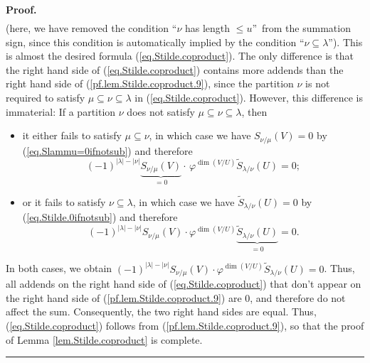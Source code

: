 \documentclass[numbers=enddot,12pt,final,onecolumn,notitlepage]{scrartcl}%
\numberwithin{exer}{section}
\theoremstyle{definition}
\newenvironment{proof}[1][Proof]{\noindent\textbf{#1.} }{\ \rule{0.5em}{0.5em}}
\theoremstyle{plainsl}
\begin{document}
\begin{proof}
\begin{align}
\label{pf.lem.Stilde.coproduct.9}%
\end{align}
(here, we have removed the condition \textquotedblleft$\nu$ has length $\leq
u$\textquotedblright\ from the summation sign, since this condition is
automatically implied by the condition \textquotedblleft$\nu\subseteq\lambda
$\textquotedblright). This is almost the desired formula
(\ref{eq.Stilde.coproduct}). The only difference is that the right hand side
of (\ref{eq.Stilde.coproduct}) contains more addends than the right hand side
of (\ref{pf.lem.Stilde.coproduct.9}), since the partition $\nu$ is not
required to satisfy $\mu\subseteq\nu\subseteq\lambda$ in
(\ref{eq.Stilde.coproduct}). However, this difference is immaterial: If a
partition $\nu$ does not satisfy $\mu\subseteq\nu\subseteq\lambda$, then

\begin{itemize}
\item it either fails to satisfy $\mu\subseteq\nu$, in which case we have
$S_{\nu/\mu}\left(  V\right)  =0$ by (\ref{eq.Slammu=0ifnotsub}) and therefore%
\[
\left(  -1\right)  ^{\left\vert \lambda\right\vert -\left\vert \nu\right\vert
}\underbrace{S_{\nu/\mu}\left(  V\right)  }_{=0}\cdot\,\varphi^{\dim\left(
V/U\right)  }\widetilde{S}_{\lambda/\nu}\left(  U\right)  =0;
\]


\item or it fails to satisfy $\nu\subseteq\lambda$, in which case we have
$\widetilde{S}_{\lambda/\nu}\left(  U\right)  =0$ by
(\ref{eq.Stilde.0ifnotsub}) and therefore%
\[
\left(  -1\right)  ^{\left\vert \lambda\right\vert -\left\vert \nu\right\vert
}S_{\nu/\mu}\left(  V\right)  \cdot\varphi^{\dim\left(  V/U\right)
}\underbrace{\widetilde{S}_{\lambda/\nu}\left(  U\right)  }_{=0}=0.
\]

\end{itemize}

\medskip In both cases, we obtain $\left(  -1\right)  ^{\left\vert
\lambda\right\vert -\left\vert \nu\right\vert }S_{\nu/\mu}\left(  V\right)
\cdot\varphi^{\dim\left(  V/U\right)  }\widetilde{S}_{\lambda/\nu}\left(
U\right)  =0$. Thus, all addends on the right hand side of
(\ref{eq.Stilde.coproduct}) that don't appear on the right hand side of
(\ref{pf.lem.Stilde.coproduct.9}) are $0$, and therefore do not affect the
sum. Consequently, the two right hand sides are equal. Thus,
(\ref{eq.Stilde.coproduct}) follows from (\ref{pf.lem.Stilde.coproduct.9}), so
that the proof of Lemma \ref{lem.Stilde.coproduct} is complete.
\end{proof}
\end{document}
